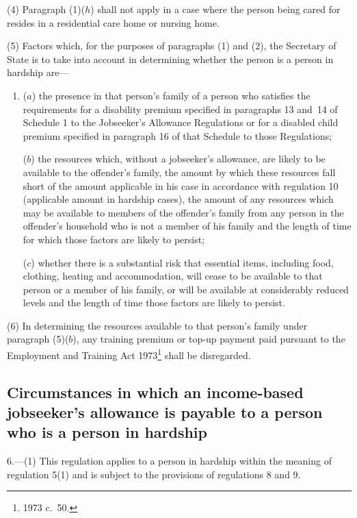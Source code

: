 \documentclass[12pt,a4paper]{article}
\begin{document}
(4) Paragraph (1)($h$)  shall not apply in a case where the person being cared for resides in a residential care home or nursing home.

(5) Factors which, for the purposes of paragraphs (1) and (2), the Secretary of State is to take into account in determining whether the person is a person in hardship are—
\begin{enumerate}\item[]
($a$) the presence in that person’s family of a person who satisfies the requirements for a disability premium specified in paragraphs 13 and~14 of Schedule 1 to the Jobseeker’s Allowance Regulations or for a disabled child premium specified in paragraph 16 of that Schedule to those Regulations;

($b$) the resources which, without a jobseeker’s allowance, are likely to be available to the offender’s family, the amount by which these resources fall short of the amount applicable in his case in accordance with regulation 10 (applicable amount in hardship cases), the amount of any resources which may be available to members of the offender’s family from any person in the offender’s household who is not a member of his family and the length of time for which those factors are likely to persist;

($c$) whether there is a substantial risk that essential items, including food, clothing, heating and accommodation, will cease to be available to that person or a member of his family, or will be available at considerably reduced levels and the length of time those factors are likely to persist.
\end{enumerate}

(6) In determining the resources available to that person’s family under paragraph (5)($b$), any training premium or top-up payment paid pursuant to the Employment and Training Act 1973\footnote{1973 c.~50.} shall be disregarded.

\subsection[6. Circumstances in which an income-based jobseeker’s allowance is payable to a person who is a person in hardship]{Circumstances in which an income-based jobseeker’s allowance is payable to a person who is a person in hardship}

6.---(1)  This regulation applies to a person in hardship within the meaning of regulation 5(1) and is subject to the provisions of regulations 8 and 9.
\end{document}
